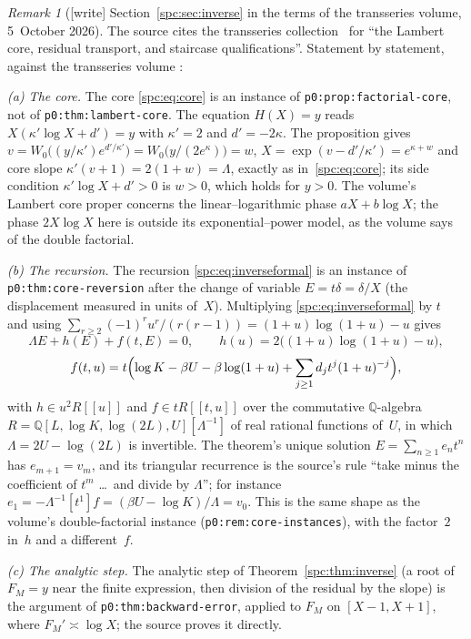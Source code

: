 \documentclass[11pt,letterpaper]{article}
\theoremstyle{definition}\newtheorem{definition}[theorem]{Definition}
\theoremstyle{remark}\newtheorem{remark}[theorem]{Remark}
\newcommand{\Q}{\mathbb Q}
\newcommand{\file}[1]{\nolinkurl{#1}}
\begin{document}
\begin{remark}[{[write]} Section~\ref{spc:sec:inverse} in the terms of the transseries volume, 5~October 2026]\label{spc:rem:transseries}
The source cites the transseries collection~\cite{ProveItTransseries} for
``the Lambert core, residual transport, and staircase qualifications''.
Statement by statement, against the transseries volume
:

\emph{(a) The core.} The core \eqref{spc:eq:core} is an instance of
\file{p0:prop:factorial-core}, not of \file{p0:thm:lambert-core}. The
equation $H(X)=y$ reads $X(\kappa'\log X+d')=y$ with $\kappa'=2$ and
$d'=-2\kappa$. The proposition gives $v=W_0\bigl((y/\kappa')e^{d'/\kappa'}\bigr)
=W_0\bigl(y/(2e^\kappa)\bigr)=w$, $X=\exp(v-d'/\kappa')=e^{\kappa+w}$ and core
slope $\kappa'(v+1)=2(1+w)=\Lambda$, exactly as in~\eqref{spc:eq:core}; its
side condition $\kappa'\log X+d'>0$ is $w>0$, which holds for $y>0$. The
volume's Lambert core proper concerns the linear--logarithmic phase
$aX+b\log X$; the phase $2X\log X$ here is outside its exponential--power
model, as the volume says of the double factorial.

\emph{(b) The recursion.} The recursion \eqref{spc:eq:inverseformal} is an
instance of \file{p0:thm:core-reversion} after the change of variable
$E=t\delta=\delta/X$ (the displacement measured in units of~$X$). Multiplying
\eqref{spc:eq:inverseformal} by $t$ and using
$\sum_{r\ge2}(-1)^ru^r/(r(r-1))=(1+u)\log(1+u)-u$ gives
\[
 \Lambda E+h(E)+f(t,E)=0,\qquad
 h(u)=2\bigl((1+u)\log(1+u)-u\bigr),
\]
\[
 f(t,u)=t\Bigl(\log K-\beta U-\beta\log(1+u)
 +\sum_{j\ge1}d_jt^j(1+u)^{-j}\Bigr),
\]
with $h\in u^2R[[u]]$ and $f\in tR[[t,u]]$ over the commutative
$\Q$-algebra $R=\Q[L,\log K,\log(2L),U][\Lambda^{-1}]$ of real rational
functions of~$U$, in which $\Lambda=2U-\log(2L)$ is invertible. The theorem's
unique solution $E=\sum_{n\ge1}e_nt^n$ has $e_{m+1}=v_m$, and its triangular
recurrence is the source's rule ``take minus the coefficient of $t^m$ \dots\
and divide by $\Lambda$''; for instance
$e_1=-\Lambda^{-1}[t^1]f=(\beta U-\log K)/\Lambda=v_0$. This is the same
shape as the volume's double-factorial instance
(\file{p0:rem:core-instances}), with the factor~$2$ in~$h$ and a different~$f$.

\emph{(c) The analytic step.} The analytic step of
Theorem~\ref{spc:thm:inverse} (a root of
$F_M=y$ near the finite expression, then division of the residual by the
slope) is the argument of \file{p0:thm:backward-error}, applied to $F_M$ on
$[X-1,X+1]$, where $F_M'\asymp\log X$; the source proves it directly.


\end{remark}
\end{document}
